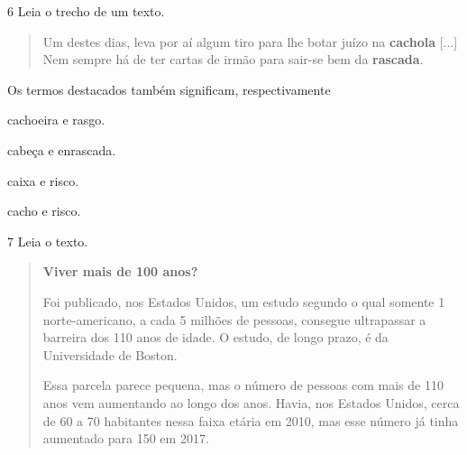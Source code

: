 \num{6} Leia o trecho de um texto.

\begin{quote}
Um destes dias, leva por aí algum tiro para lhe botar juízo na
\textbf{cachola} {[}...{]} Nem sempre há de ter cartas de irmão para
sair-se bem da \textbf{rascada}.

\end{quote}

Os termos destacados também significam, respectivamente

\begin{minipage}{.5\textwidth}
\begin{escolha}
\item cachoeira e rasgo.

\item cabeça e enrascada.

\item caixa e risco.

\item cacho e risco.
\end{escolha}
\end{minipage}

\pagebreak

\num{7} Leia o texto.

\begin{quote}
\textbf{Viver mais de 100 anos?}

Foi publicado, nos Estados Unidos, um estudo segundo o qual somente 1 norte-americano,
a cada 5 milhões de pessoas, consegue ultrapassar a barreira dos 110 anos de idade.
O estudo, de longo prazo, é da Universidade de Boston.

Essa parcela parece pequena, mas o número de pessoas com mais de 110 anos vem aumentando
ao longo dos anos. Havia, nos Estados Unidos, cerca de 60 a 70 habitantes nessa faixa
etária em 2010, mas esse número já tinha aumentado para 150 em 2017.

\end{quote}

